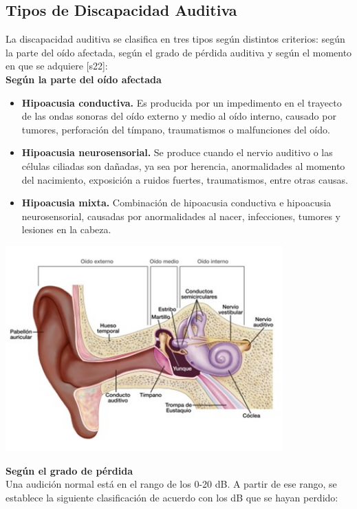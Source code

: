 \subsection{Tipos de Discapacidad Auditiva}
La discapacidad auditiva se clasifica en tres tipos según distintos criterios: según la parte del oído afectada, según el grado de pérdida auditiva y según el momento en que se adquiere [s22]:\\
\newline\textbf{Según la parte del oído afectada}
\begin{itemize}
    \item \textbf{Hipoacusia conductiva.} Es producida por un impedimento en el trayecto de las ondas sonoras del oído externo y medio al oído interno, causado por tumores, perforación del tímpano, traumatismos o malfunciones del oído.  
    \item \textbf{Hipoacusia neurosensorial.} Se produce cuando el nervio auditivo o las células ciliadas son dañadas, ya sea por herencia, anormalidades al momento del nacimiento, exposición a ruidos fuertes, traumatismos, entre otras causas.  
    \item \textbf{Hipoacusia mixta.} Combinación de hipoacusia conductiva e hipoacusia neurosensorial, causadas por anormalidades al nacer, infecciones, tumores y lesiones en la cabeza.  
\end{itemize}

\begin{center}
    \includegraphics[width=0.8\textwidth]{Images/Cap 2/PartesOido.jpg}
\end{center}

\textbf{Según el grado de pérdida}\\
Una audición normal está en el rango de los 0-20 dB. A partir de ese rango, se establece la siguiente clasificación de acuerdo con los dB que se hayan perdido:

